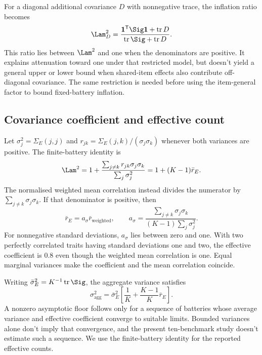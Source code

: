 For a diagonal additional covariance $D$ with nonnegative trace, the inflation ratio becomes
\begin{equation}
\Lam_D^2=\frac{\mathbf1^{\mathsf T}\Sig\mathbf1+\operatorname{tr}D}
{\operatorname{tr}\Sig+\operatorname{tr}D}.
\end{equation}
This ratio lies between $\Lam^2$ and one when the denominators are positive. It explains attenuation toward one under that restricted model, but doesn't yield a general upper or lower bound when shared-item effects also contribute off-diagonal covariance. The same restriction is needed before using the item-general factor to bound fixed-battery inflation.

\subsection{Covariance coefficient and effective count}
Let $\sigma_j^2=\Sigma_E(j,j)$ and $r_{jk}=\Sigma_E(j,k)/(\sigma_j\sigma_k)$ whenever both variances are positive. The finite-battery identity is
\begin{equation}
\Lam^2=1+\frac{\sum_{j\ne k}r_{jk}\sigma_j\sigma_k}{\sum_j\sigma_j^2}
=1+(K-1)\bar r_E.
\end{equation}
The normalised weighted mean correlation instead divides the numerator by $\sum_{j\ne k}\sigma_j\sigma_k$. If that denominator is positive, then
\begin{equation}
\bar r_E=a_\sigma\bar r_{\mathrm{weighted}},\qquad
a_\sigma=\frac{\sum_{j\ne k}\sigma_j\sigma_k}{(K-1)\sum_j\sigma_j^2}.
\end{equation}
For nonnegative standard deviations, $a_\sigma$ lies between zero and one. With two perfectly correlated traits having standard deviations one and two, the effective coefficient is 0.8 even though the weighted mean correlation is one. Equal marginal variances make the coefficient and the mean correlation coincide.

Writing $\bar\sigma_E^2=K^{-1}\operatorname{tr}\Sig$, the aggregate variance satisfies
\begin{equation}
\sigma_{\mathrm{agg}}^2=\bar\sigma_E^2\left[\frac1K+\frac{K-1}{K}\bar r_E\right].
\end{equation}
A nonzero asymptotic floor follows only for a sequence of batteries whose average variance and effective coefficient converge to suitable limits. Bounded variances alone don't imply that convergence, and the present ten-benchmark study doesn't estimate such a sequence. We use the finite-battery identity for the reported effective counts.


